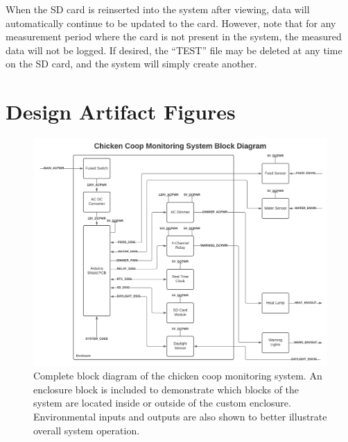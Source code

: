 \documentclass{article}
\begin{document}
When the SD card is reinserted into the system after viewing, data will automatically continue to be updated to the card. However, note that for any measurement period where the card is not present in the system, the measured data will not be logged. If desired, the “TEST” file may be deleted at any time on the SD card, and the system will simply create another.
\newpage

\section{Design Artifact Figures}

\begin{figure}[H]
    \centering
    \includegraphics[width=\textwidth]{fig/block-diagram.pdf}
    \caption{Complete block diagram of the chicken coop monitoring system. An enclosure block is included to demonstrate which blocks of the system are located inside or outside of the custom enclosure.  Environmental inputs and outputs are also shown to better illustrate overall system operation.}
    \label{fig:block-diagram}
\end{figure}
\end{document}
